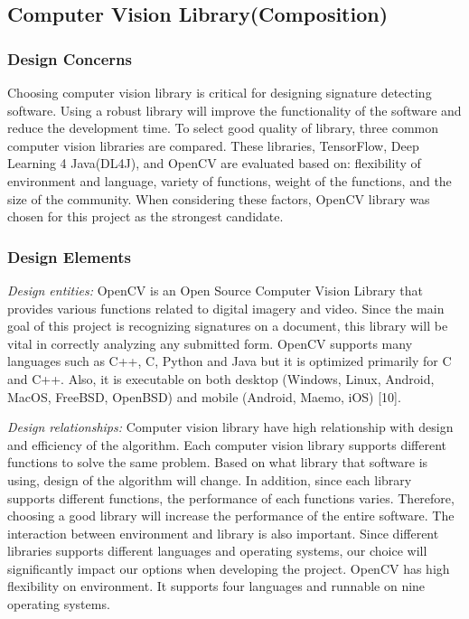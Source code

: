 \documentclass[onecolumn, draftclsnofoot,10pt, compsoc]{IEEEtran}
\begin{document}
\subsection{Computer Vision Library(Composition)}
\subsubsection{Design Concerns}
Choosing computer vision library is critical for designing signature detecting software. Using a robust library will improve the functionality of the software and reduce the development time. To select good quality of library, three common computer vision libraries are compared. These libraries, TensorFlow, Deep Learning 4 Java(DL4J), and OpenCV are evaluated based on: flexibility of environment and language, variety of functions, weight of the functions, and the size of the community. When considering these factors, OpenCV library was chosen for this project as the strongest candidate.

\subsubsection{Design Elements}
	\emph{Design entities:}
OpenCV is an Open Source Computer Vision Library that provides various functions related to digital imagery and video. Since the main goal of this project is recognizing signatures on a document, this library will be vital in correctly analyzing any submitted form. OpenCV supports many languages such as C++, C, Python and Java but it is optimized primarily for C and C++.  Also, it is executable on both desktop (Windows, Linux, Android, MacOS, FreeBSD, OpenBSD) and mobile (Android, Maemo, iOS) [10].

	\emph{Design relationships:}
Computer vision library have high relationship with design and efficiency of the algorithm. Each computer vision library supports different functions to solve the same problem.  Based on what library that software is using, design of the algorithm will change. In addition, since each library supports different functions, the performance of each functions varies. Therefore, choosing a good library will increase the performance of the entire software.
The interaction between environment and library is also important.  Since different libraries supports different languages and operating systems, our choice will significantly impact our options when developing the project. OpenCV has high flexibility on environment. It supports four languages and runnable on nine operating systems.
\end{document}
